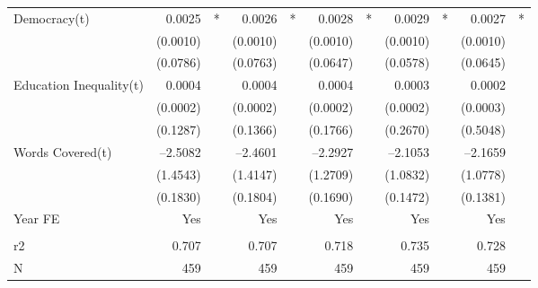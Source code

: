 \begin{tabular} {l* {5}{r @{} l}}
Democracy(t)&      0.0025&*  &      0.0026&*  &      0.0028&*  &      0.0029&*  &      0.0027&*  \\
            &    (0.0010)&   &    (0.0010)&   &    (0.0010)&   &    (0.0010)&   &    (0.0010)&   \\
            &    (0.0786)&   &    (0.0763)&   &    (0.0647)&   &    (0.0578)&   &    (0.0645)&   \\
Education Inequality(t)&      0.0004&   &      0.0004&   &      0.0004&   &      0.0003&   &      0.0002&   \\
            &    (0.0002)&   &    (0.0002)&   &    (0.0002)&   &    (0.0002)&   &    (0.0003)&   \\
            &    (0.1287)&   &    (0.1366)&   &    (0.1766)&   &    (0.2670)&   &    (0.5048)&   \\
Words Covered(t)&    --2.5082&   &    --2.4601&   &    --2.2927&   &    --2.1053&   &    --2.1659&   \\
            &    (1.4543)&   &    (1.4147)&   &    (1.2709)&   &    (1.0832)&   &    (1.0778)&   \\
            &    (0.1830)&   &    (0.1804)&   &    (0.1690)&   &    (0.1472)&   &    (0.1381)&   \\
Year FE     &         Yes&   &         Yes&   &         Yes&   &         Yes&   &         Yes&   \\
 \\
r2          &       0.707&   &       0.707&   &       0.718&   &       0.735&   &       0.728&   \\
N           &         459&   &         459&   &         459&   &         459&   &         459&   \\
\hline
\end{tabular}
